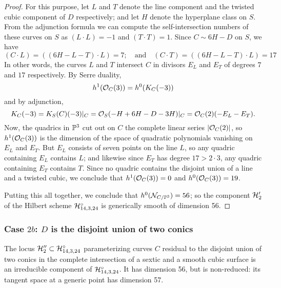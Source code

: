 \begin{proof}
For this purpose, let $L$ and $T$ denote the line component and the twisted cubic component of $D$ respectively; and let $H$ denote the hyperplane class on $S$. From the adjunction formula we can compute the self-intersection numbers of these curves on $S$ as $(L \cdot L) = -1$ and $(T \cdot T) = 1$. Since $C \sim 6H - D$ on $S$, we have
$$
(C\cdot L) = ((6H - L - T) \cdot L) = 7; \quad \text{and} \quad (C\cdot T) = ((6H - L - T) \cdot L) = 17
$$
In other words, the curves $L$ and $T$ intersect $C$ in divisors $E_L$ and $E_T$ of degrees $7$ and $17$ respectively. By Serre duality, 
$$
h^1(\cO_C(3)) = h^0(K_C(-3)) 
$$
and by adjunction,
$$
K_C(-3) = K_S(C)(-3)|_C = \cO_S(-H + 6H - D - 3H)|_C = \cO_C(2)(-E_L-E_T).
$$
Now, the quadrics in $\PP^3$ cut out on $C$ the complete linear series $|\cO_C(2)|$, 
so $h^1(\cO_C(3))$ is the dimension of the space of quadratic polynomials vanishing on $E_L$ and $E_T$. But $E_L$ consists of seven points on the line $L$, so any quadric containing $E_L$ contains $L$; and likewise since $E_T$ has degree $17 > 2\cdot 3$, any quadric containing $E_T$ contains $T$. Since no quadric contains the disjoint union of a line and a twisted cubic, we conclude that $h^1(\cO_C(3))=0$ and $h^0(\cO_C(3)) = 19$.

Putting this all together, we conclude that $h^0(\cN_{C/\PP^3}) = 56$; so the component $\cH_{2}'$ of the Hilbert scheme $\cH^\circ_{14,3,24}$ is generically smooth of dimension 56.
\end{proof}

\subsubsection{Case $2b$: $D$ is the disjoint union of two conics}

\begin{proposition}\label{mumford component}
The locus $\cH_{2}'' \subset \cH^\circ_{14,3,24}$ parameterizing curves $C$ residual to the disjoint union of two conics in the complete intersection of a sextic and a smooth cubic surface is an irreducible component of  $\cH^\circ_{14,3,24}$. It has dimension 56, but is non-reduced: its tangent space at
a generic point has dimension 57.
\end{proposition} 


